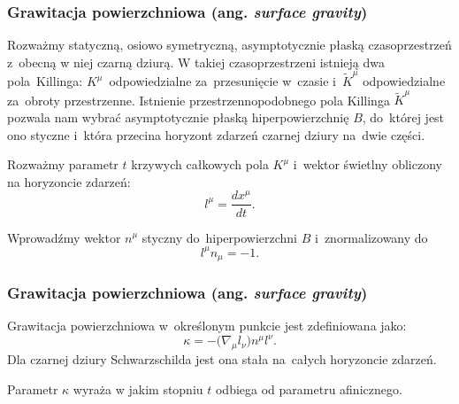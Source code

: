 \documentclass[10pt,t]{beamer}
\begin{document}
\begin{frame}
  \frametitle{Grawitacja powierzchniowa (ang. \textit{surface gravity})}


  Rozważmy statyczną, osiowo symetryczną, asymptotycznie płaską
  czasoprzestrzeń z~obecną w niej czarną dziurą. W takiej
  czasoprzestrzeni istnieją dwa pola~Killinga:
  $K^{ \mu }$~odpowiedzialne za~przesunięcie w~czasie
  i~$\widetilde{ K }^{ \mu }$ odpowiedzialne za~obroty przestrzenne.
  Istnienie przestrzennopodobnego pola Killinga $\tilde{ K }^{ \mu }$
  pozwala nam wybrać asymptotycznie płaską hiperpowierzchnię $B$,
  do~której jest ono styczne i~która przecina horyzont zdarzeń czarnej
  dziury na~dwie części.

  Rozważmy parametr $t$ krzywych całkowych pola $K^{ \mu }$ i~wektor
  świetlny obliczony na horyzoncie zdarzeń:
  \begin{equation}
    \label{eq:Promieniowanie-Hawkinga-01}
    l^{ \mu } =  \frac{ d x^{ \mu } }{ d t }.
  \end{equation}

  Wprowadźmy wektor $n^{ \mu }$ styczny do~hiperpowierzchni $B$
  i~znormalizowany do
  \begin{equation}
    \label{eq:Promieniowanie-Hawkinga-02}
    l^{ \mu } n_{ \mu } = -1.
  \end{equation}

\end{frame}





\begin{frame}
  \frametitle{Grawitacja powierzchniowa (ang. \textit{surface gravity})}


  Grawitacja powierzchniowa w~określonym punkcie jest zdefiniowana
  jako:
  \begin{equation}
    \label{eq:Promieniowanie-Hawkinga-03}
    \kappa = -\big( \nabla_{ \mu } l_{ \nu } \big) n^{ \mu } l^{ \nu }.
  \end{equation}
  Dla czarnej dziury Schwarzschilda jest ona stała na~całych
  horyzoncie zdarzeń.

  Parametr $\kappa$ wyraża w jakim stopniu $t$ odbiega od parametru
  afinicznego.

\end{frame}
\end{document}
